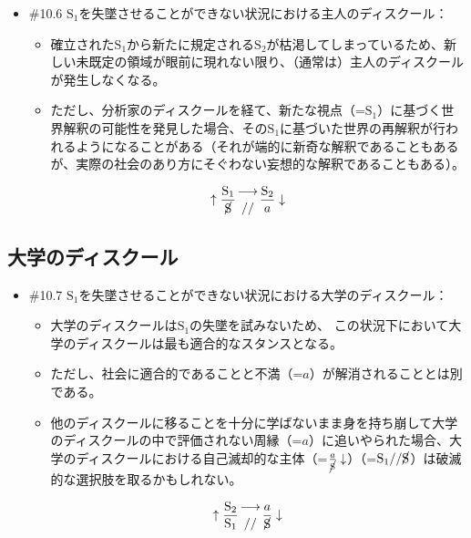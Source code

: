 \begin{note}{}
  \begin{itemize}
    \tightlist
    \item{\#10.6} $\textrm{S}_1$を失墜させることができない状況における主人のディスクール：
      \begin{itemize}
        \tightlist
        \item 確立された$\textrm{S}_1$から新たに規定される$\textrm{S}_2$が枯渇してしまっているため、新しい未既定の領域が眼前に現れない限り、（通常は）主人のディスクールが発生しなくなる。
        \item ただし、分析家のディスクールを経て、新たな視点（=$\textrm{S}_1$）に基づく世界解釈の可能性を発見した場合、その$\textrm{S}_1$に基づいた世界の再解釈が行われるようになることがある（それが端的に新奇な解釈であることもあるが、実際の社会のあり方にそぐわない妄想的な解釈であることもある）。
      \end{itemize}

$$
\uparrow\frac{\mathrm{S_1}}{\cancel{\textrm{S}}}\genfrac{}{}{0pt}{}{\longrightarrow}{//}\frac{\mathrm{S_2}}{a}\downarrow
$$
  \end{itemize}
\end{note}

\subsection{大学のディスクール}\label{ux5927ux5b66ux306eux30c7ux30a3ux30b9ux30afux30fcux30eb}

\begin{note}{}
  \begin{itemize}
    \tightlist
    \item{\#10.7} $\textrm{S}_1$を失墜させることができない状況における大学のディスクール：
      \begin{itemize}
        \tightlist
        \item 大学のディスクールは$\textrm{S}_1$の失墜を試みないため、  この状況下において大学のディスクールは最も適合的なスタンスとなる。
        \item ただし、社会に適合的であることと不満（=$a$）が解消されることとは別である。
        \item 他のディスクールに移ることを十分に学ばないまま身を持ち崩して大学のディスクールの中で評価されない周縁（=$a$）に追いやられた場合、大学のディスクールにおける自己滅却的な主体（=$\frac{a}{\cancel{\textrm{S}}}\downarrow$）（=$\textrm{S}_1//\cancel{\textrm{S}}$）は破滅的な選択肢を取るかもしれない。
      \end{itemize}

$$
\uparrow\frac{\mathrm{S_2}}{\mathrm{S_1}}\genfrac{}{}{0pt}{}{\longrightarrow}{//}\frac{a}{\cancel{\textrm{S}}}\downarrow
$$
  \end{itemize}
\end{note}

